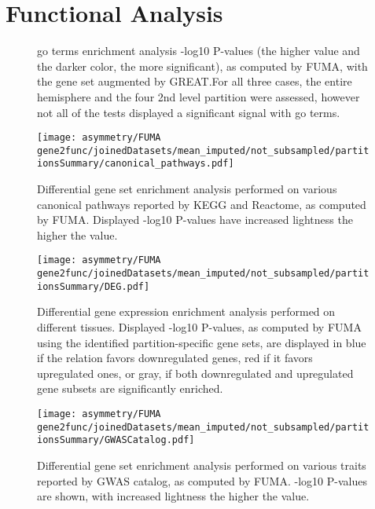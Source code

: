 \chapter{Functional Analysis}
\begin{figure}[H]
	\centering
	\quad
	\quad
	\caption[GO terms enrichment analysis]{\Ac{go} terms enrichment analysis -log10 P-values (the higher value and the darker color, the more significant), as computed by FUMA, with the gene set augmented by GREAT.For all three cases, the entire hemisphere and the four 2nd level partition were assessed, however not all of the tests displayed a significant signal with \ac{go} terms.}
	\label{fig:go}
\end{figure}

\begin{figure}[H]
	\centering
	\texttt{[image: asymmetry/FUMA gene2func/joinedDatasets/mean\_imputed/not\_subsampled/partitionsSummary/canonical\_pathways.pdf]}
	
	\caption[Canonical pathways gene set enrichment analysis]{Differential gene set enrichment analysis performed on various canonical pathways reported by KEGG and Reactome, as computed by FUMA. Displayed -log10 P-values have increased lightness the higher the value.}
	\label{fig:can_pathways}
\end{figure}
\begin{figure}[H]
	\centering
	\texttt{[image: asymmetry/FUMA gene2func/joinedDatasets/mean\_imputed/not\_subsampled/partitionsSummary/DEG.pdf]}
	
	\caption[Differential gene expression enrichment analysis]{Differential gene expression enrichment analysis performed on different tissues. Displayed -log10 P-values, as computed by FUMA using the identified partition-specific gene sets, are displayed in blue if the relation favors downregulated genes, red if it favors upregulated ones, or gray, if both downregulated and upregulated gene subsets are significantly enriched.}
	\label{fig:de_genes}
\end{figure}
\begin{figure}[H]
	\centering
	\texttt{[image: asymmetry/FUMA gene2func/joinedDatasets/mean\_imputed/not\_subsampled/partitionsSummary/GWASCatalog.pdf]}
	
	\caption[GWAS Catalog gene set enrichment analysis]{Differential gene set enrichment analysis performed on various traits reported by GWAS catalog, as computed by FUMA. -log10 P-values are shown, with increased lightness the higher the value.}
	\label{fig:gw_catalog}
\end{figure}
